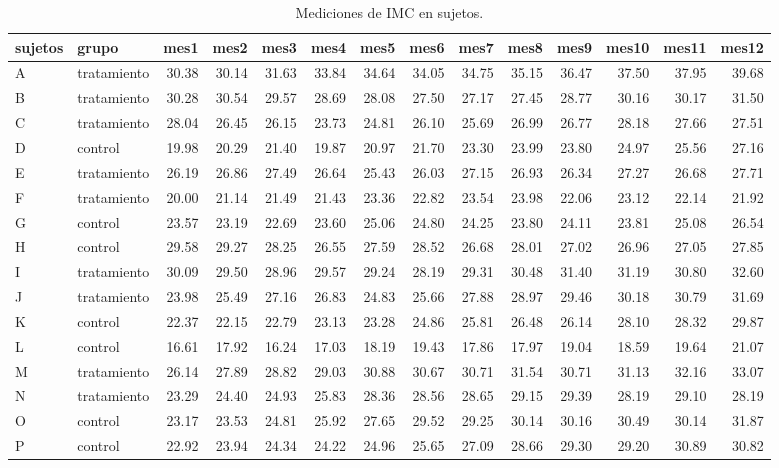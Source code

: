 \documentclass[]{article}
\begin{document}
\begin{table}[H]
\centering
\begingroup\tiny
\begin{tabular}{llrrrrrrrrrrrr}
  \hline
sujetos & grupo & mes1 & mes2 & mes3 & mes4 & mes5 & mes6 & mes7 & mes8 & mes9 & mes10 & mes11 & mes12 \\ 
  \hline
A & tratamiento & 30.38 & 30.14 & 31.63 & 33.84 & 34.64 & 34.05 & 34.75 & 35.15 & 36.47 & 37.50 & 37.95 & 39.68 \\ 
  B & tratamiento & 30.28 & 30.54 & 29.57 & 28.69 & 28.08 & 27.50 & 27.17 & 27.45 & 28.77 & 30.16 & 30.17 & 31.50 \\ 
  C & tratamiento & 28.04 & 26.45 & 26.15 & 23.73 & 24.81 & 26.10 & 25.69 & 26.99 & 26.77 & 28.18 & 27.66 & 27.51 \\ 
  D & control & 19.98 & 20.29 & 21.40 & 19.87 & 20.97 & 21.70 & 23.30 & 23.99 & 23.80 & 24.97 & 25.56 & 27.16 \\ 
  E & tratamiento & 26.19 & 26.86 & 27.49 & 26.64 & 25.43 & 26.03 & 27.15 & 26.93 & 26.34 & 27.27 & 26.68 & 27.71 \\ 
  F & tratamiento & 20.00 & 21.14 & 21.49 & 21.43 & 23.36 & 22.82 & 23.54 & 23.98 & 22.06 & 23.12 & 22.14 & 21.92 \\ 
  G & control & 23.57 & 23.19 & 22.69 & 23.60 & 25.06 & 24.80 & 24.25 & 23.80 & 24.11 & 23.81 & 25.08 & 26.54 \\ 
  H & control & 29.58 & 29.27 & 28.25 & 26.55 & 27.59 & 28.52 & 26.68 & 28.01 & 27.02 & 26.96 & 27.05 & 27.85 \\ 
  I & tratamiento & 30.09 & 29.50 & 28.96 & 29.57 & 29.24 & 28.19 & 29.31 & 30.48 & 31.40 & 31.19 & 30.80 & 32.60 \\ 
  J & tratamiento & 23.98 & 25.49 & 27.16 & 26.83 & 24.83 & 25.66 & 27.88 & 28.97 & 29.46 & 30.18 & 30.79 & 31.69 \\ 
  K & control & 22.37 & 22.15 & 22.79 & 23.13 & 23.28 & 24.86 & 25.81 & 26.48 & 26.14 & 28.10 & 28.32 & 29.87 \\ 
  L & control & 16.61 & 17.92 & 16.24 & 17.03 & 18.19 & 19.43 & 17.86 & 17.97 & 19.04 & 18.59 & 19.64 & 21.07 \\ 
  M & tratamiento & 26.14 & 27.89 & 28.82 & 29.03 & 30.88 & 30.67 & 30.71 & 31.54 & 30.71 & 31.13 & 32.16 & 33.07 \\ 
  N & tratamiento & 23.29 & 24.40 & 24.93 & 25.83 & 28.36 & 28.56 & 28.65 & 29.15 & 29.39 & 28.19 & 29.10 & 28.19 \\ 
  O & control & 23.17 & 23.53 & 24.81 & 25.92 & 27.65 & 29.52 & 29.25 & 30.14 & 30.16 & 30.49 & 30.14 & 31.87 \\ 
  P & control & 22.92 & 23.94 & 24.34 & 24.22 & 24.96 & 25.65 & 27.09 & 28.66 & 29.30 & 29.20 & 30.89 & 30.82 \\ 
   \hline
\end{tabular}
\endgroup
\caption{Mediciones de IMC en sujetos.} 
\label{tab:sujetos}
\end{table}
\end{document}
